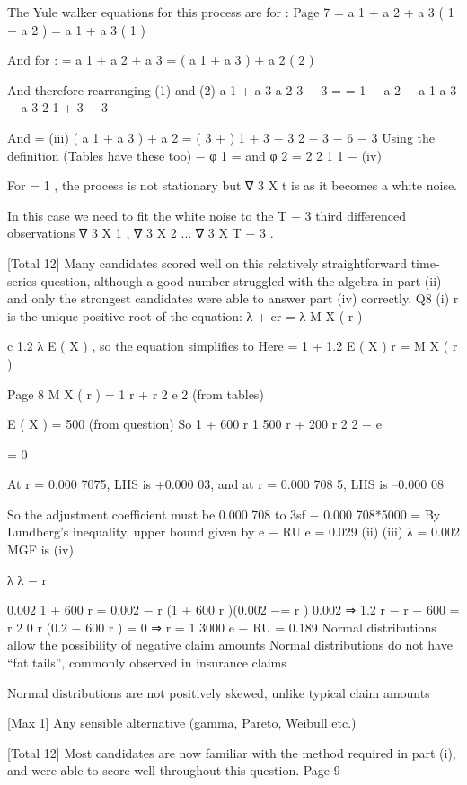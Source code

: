 \documentclass[a4paper,12pt]{article}
\begin{document}
The Yule walker equations for this process are for  :
Page 7 %
 = a 1 + a 2  + a 3 
 ( 1 − a 2 ) =           
a 1 + a 3 
( 1 )

And for  :
 = a 1  + a 2 + a 3 
 =
( a 1 + a 3 )  + a 2           ( 2 )

And therefore rearranging (1) and (2)
a 1 + a 3 a 2
3 \alpha  − 3 
=
=
1 − a 2 − a 1 a 3 − a 3 2 1 + 3  − 3  − 

And
 =
(iii)
( a 1 + a 3 )  + a 2 =
(
3 \alpha  + 
) 1 + 3  \alpha  − 3 
2
− 3 \alpha  − 
6
− 3 
Using the definition (Tables have these too)
\rho − 
φ 1 =   
and φ 2 = 2 2 1
1 − 
(iv)


For \alpha  = 1 , the process is not stationary but ∇ 3 X t is as it becomes a white
noise.

In this case we need to fit the white noise to the T − 3 third differenced
observations ∇ 3 X 1 , ∇ 3 X 2 ... ∇ 3 X T − 3 .

[Total 12]
Many candidates scored well on this relatively straightforward time-
series question, although a good number struggled with the algebra in
part (ii) and only the strongest candidates were able to answer part (iv)
correctly.
Q8
(i)
r is the unique positive root of the equation:
λ + cr = λ M X ( r )

c 1.2 λ E ( X ) , so the equation simplifies to
Here =
1 + 1.2 E ( X ) r =
M X ( r )

Page 8 %
M X ( r ) =
1
\mu r +  r 2
e 2
(from tables)

E ( X ) = 500 (from question)
So 1 + 600 r
1
500 r + 200 r 2
2
− e

= 0

At r = 0.000 7075, LHS is +0.000 03, and at r = 0.000 708 5, LHS is
–0.000 08

So the adjustment coefficient must be 0.000 708 to 3sf
− 0.000 708*5000
=
By Lundberg’s inequality, upper bound given
by e − RU e =
0.029
(ii)
(iii)
λ = 0.002
MGF is
(iv)


λ
λ − r

0.002
1 + 600 r =
0.002 − r 
(1 + 600 r )(0.002 −=
r ) 0.002 ⇒ 1.2 r − r − 600 =
r 2 0 
r (0.2 − 600 r ) = 0 ⇒ r = 1 
3000
e − RU = 0.189 
Normal distributions allow the possibility of negative claim amounts 
Normal distributions do not have “fat tails”, commonly observed in insurance
claims

Normal distributions are not positively skewed, unlike typical claim amounts

[Max 1]
Any sensible alternative (gamma, Pareto, Weibull etc.)

[Total 12]
Most candidates are now familiar with the method required in part (i),
and were able to score well throughout this question.
Page 9 %
\end{document}
